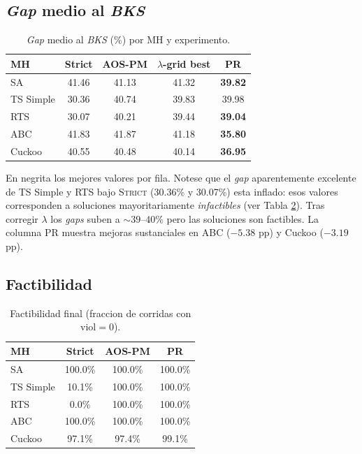 \documentclass[11pt,a4paper]{article}
\newcommand{\mh}{MH}
\newcommand{\meta}[1]{\textsc{#1}}
\begin{document}
\subsection{\emph{Gap} medio al \emph{BKS}}

\begin{table}[h]
\centering
\caption{\emph{Gap} medio al \emph{BKS} (\%) por \mh{} y experimento.}
\label{tab:gap}
\small
\begin{tabular}{lcccc}
\toprule
\mh{} & Strict & AOS-PM & $\lambda$-grid best & PR \\
\midrule
SA           & 41.46 & 41.13 & 41.32 & \textbf{39.82} \\
TS Simple    & 30.36 & 40.74 & 39.83 & 39.98 \\
RTS          & 30.07 & 40.21 & 39.44 & \textbf{39.04} \\
ABC          & 41.83 & 41.87 & 41.18 & \textbf{35.80} \\
Cuckoo       & 40.55 & 40.48 & 40.14 & \textbf{36.95} \\
\bottomrule
\end{tabular}
\end{table}

\noindent En negrita los mejores valores por fila. Notese que el
\emph{gap} aparentemente excelente de TS Simple y RTS bajo
\meta{Strict} (30.36\% y 30.07\%) esta inflado: esos valores
corresponden a soluciones mayoritariamente \emph{infactibles}
(ver Tabla \ref{tab:fact}). Tras corregir $\lambda$ los \emph{gaps}
suben a $\sim 39$--$40\%$ pero las soluciones son factibles. La
columna PR muestra mejoras sustanciales en ABC ($-5.38$ pp) y
Cuckoo ($-3.19$ pp).

\subsection{Factibilidad}

\begin{table}[h]
\centering
\caption{Factibilidad final (fraccion de corridas con
$\text{viol}=0$).}\label{tab:fact}
\small
\begin{tabular}{lccc}
\toprule
\mh{} & Strict & AOS-PM & PR \\
\midrule
SA           & 100.0\% & 100.0\% & 100.0\% \\
TS Simple    & 10.1\%  & 100.0\% & 100.0\% \\
RTS          & 0.0\%   & 100.0\% & 100.0\% \\
ABC          & 100.0\% & 100.0\% & 100.0\% \\
Cuckoo       & 97.1\%  & 97.4\%  & 99.1\%  \\
\bottomrule
\end{tabular}
\end{table}
\end{document}
